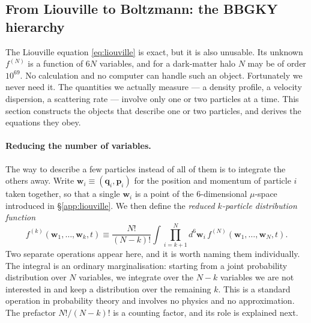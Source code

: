\documentclass[12pt]{article}
\renewcommand{\vec}[1]{\bm{#1}}
\begin{document}
\subsection{From Liouville to Boltzmann: the BBGKY hierarchy}
\label{app:bbgky}

The Liouville equation \eqref{eq:liouville} is exact, but it is also
unusable.  Its unknown $f^{(N)}$ is a function of $6N$ variables, and
for a dark-matter halo $N$ may be of order $10^{69}$.  No calculation
and no computer can handle such an object.  Fortunately we never need
it.  The quantities we actually measure --- a density profile, a
velocity dispersion, a scattering rate --- involve only one or two
particles at a time.  This section constructs the objects that describe
one or two particles, and derives the equations they obey.

\paragraph{Reducing the number of variables.}  The way to describe a
few particles instead of all of them is to integrate the others away.
Write $\vec w_i \equiv (\vec q_i,\vec p_i)$ for the position and
momentum of particle $i$ taken together, so that a single $\vec w_i$ is
a point of the $6$-dimensional $\mu$-space introduced in
\S\ref{app:liouville}.  We then define the \emph{reduced $k$-particle
distribution function}
%
\begin{equation}
  f^{(k)}(\vec w_1,\ldots,\vec w_k, t)
    \equiv \frac{N!}{(N-k)!}\!\int\!\prod_{i=k+1}^{N} d^6\vec w_i\,
           f^{(N)}(\vec w_1,\ldots,\vec w_N,t).
  \label{eq:reduced_df}
\end{equation}
%
Two separate operations appear here, and it is worth naming them
individually.  The integral is an ordinary marginalisation: starting
from a joint probability distribution over $N$ variables, we integrate
over the $N-k$ variables we are not interested in and keep a
distribution over the remaining $k$.  This is a standard operation in
probability theory and involves no physics and no approximation.  The
prefactor $N!/(N-k)!$ is a counting factor, and its role is explained
next.
\end{document}
